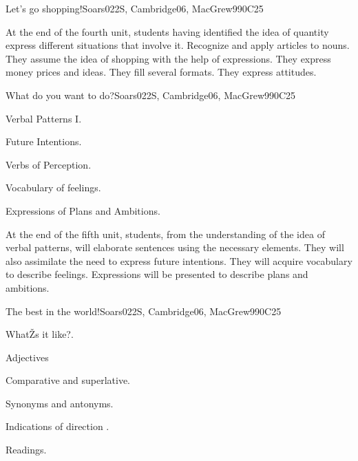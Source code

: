 \begin{syllabus}
\begin{unit}{Let's go shopping!}{}{Soars022S, Cambridge06, MacGrew99}{0}{C25}
   \begin{learningoutcomes}
      \item At the end  of the fourth unit, students having identified the idea of quantity express different situations that involve it. Recognize and apply articles to nouns. They assume the idea of shopping with the help of expressions. They express money prices and ideas. They fill several formats. They express attitudes.
   \end{learningoutcomes}

\end{unit}

\begin{unit}{What do you want to do?}{}{Soars022S, Cambridge06, MacGrew99}{0}{C25}
   \begin{topics}
      \item Verbal Patterns I.
      \item Future Intentions.
      \item Verbs of Perception.
      \item Vocabulary of feelings.
      \item Expressions of Plans and Ambitions.
   \end{topics}

   \begin{learningoutcomes}
      \item At the end of the fifth unit, students, from the understanding of the idea of verbal patterns, will elaborate sentences using the necessary elements. They will also assimilate the need to express future intentions. They will acquire vocabulary to describe feelings. Expressions will be presented to describe plans and ambitions.
   \end{learningoutcomes}
\end{unit}

\begin{unit}{The best in the world!}{}{Soars022S, Cambridge06, MacGrew99}{0}{C25}
   \begin{topics}
      \item WhatŽs it like?.
      \item Adjectives 
      \item Comparative and superlative.
      \item Synonyms and antonyms. 
      \item Indications of direction .
      \item Readings.
   \end{topics}


\end{unit}
\end{syllabus}
